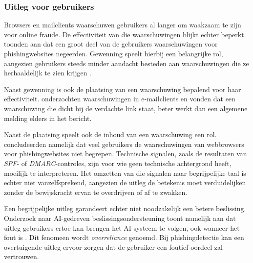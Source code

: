 \subsubsection{Uitleg voor gebruikers}
\label{subsubsec:uitleg-voor-gebruikers}

Browsers en mailclients waarschuwen gebruikers al langer om waakzaam te zijn voor online fraude. De effectiviteit van die waarschuwingen blijkt echter beperkt. \textcite{Egelman2008} toonden aan dat een groot deel van de gebruikers waarschuwingen voor phishingwebsites negeerden. Gewenning speelt hierbij een belangrijke rol, aangezien gebruikers steeds minder aandacht besteden aan waarschuwingen die ze herhaaldelijk te zien krijgen \autocite{Anderson2015}.

Naast gewenning is ook de plaatsing van een waarschuwing bepalend voor haar effectiviteit. \textcite{Petelka2019} onderzochten waarschuwingen in e-mailclients en vonden dat een waarschuwing die dicht bij de verdachte link staat, beter werkt dan een algemene melding elders in het bericht.

Naast de plaatsing speelt ook de inhoud van een waarschuwing een rol. \textcite{Egelman2008} concludeerden namelijk dat veel gebruikers de waarschuwingen van webbrowsers voor phishingwebsites niet begrepen. Technische signalen, zoals de resultaten van \emph{SPF}- of \emph{DMARC}-controles, zijn voor wie geen technische achtergrond heeft, moeilijk te interpreteren. Het omzetten van die signalen naar begrijpelijke taal is echter niet vanzelfsprekend, aangezien de uitleg de betekenis moet verduidelijken zonder de bewijskracht ervan te overdrijven of af te zwakken. 

Een begrijpelijke uitleg garandeert echter niet noodzakelijk een betere beslissing. Onderzoek naar AI-gedreven beslissingsondersteuning toont namelijk aan dat uitleg gebruikers ertoe kan brengen het AI-systeem te volgen, ook wanneer het fout is \autocite{Bucinca2021}. Dit fenomeen wordt \emph{overreliance} genoemd. Bij phishingdetectie kan een overtuigende uitleg ervoor zorgen dat de gebruiker een foutief oordeel zal vertrouwen. 